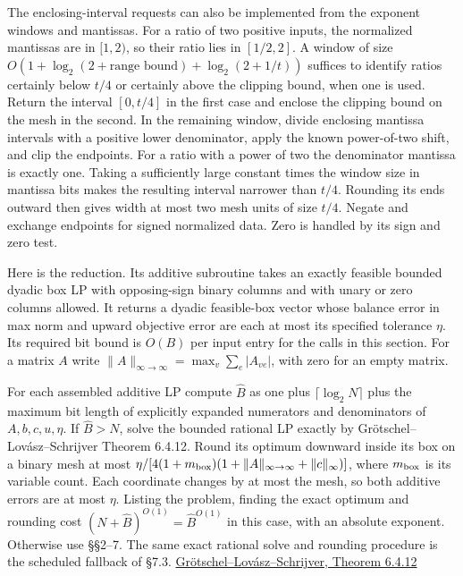 \documentclass[11pt]{article}
\begin{document}
The enclosing-interval requests can also be implemented from the exponent windows and mantissas. For a ratio of two positive inputs, the normalized mantissas are in \([1,2)\), so their ratio lies in \([1/2,2]\). A window of size \(O(1+\log_2(2+\text{range bound})+\log_2(2+1/t))\) suffices to identify ratios certainly below \(t/4\) or certainly above the clipping bound, when one is used. Return the interval \([0,t/4]\) in the first case and enclose the clipping bound on the mesh in the second. In the remaining window, divide enclosing mantissa intervals with a positive lower denominator, apply the known power-of-two shift, and clip the endpoints. For a ratio with a power of two the denominator mantissa is exactly one. Taking a sufficiently large constant times the window size in mantissa bits makes the resulting interval narrower than \(t/4\). Rounding its ends outward then gives width at most two mesh units of size \(t/4\). Negate and exchange endpoints for signed normalized data. Zero is handled by its sign and zero test.

Here is the reduction. Its additive subroutine takes an exactly feasible bounded dyadic box LP with opposing-sign binary columns and with unary or zero columns allowed. It returns a dyadic feasible-box vector whose balance error in max norm and upward objective error are each at most its specified tolerance \(\eta\). Its required bit bound is \(O(B)\) per input entry for the calls in this section. For a matrix \(A\) write \(\|A\|_{\infty\to\infty}=\max_v\sum_e|A_{ve}|\), with zero for an empty matrix.

For each assembled additive LP compute \(\widehat B\) as one plus \(\lceil\log_2 N\rceil\) plus the maximum bit length of explicitly expanded numerators and denominators of \(A,b,c,u,\eta\). If \(\widehat B>N\), solve the bounded rational LP exactly by Grötschel--Lovász--Schrijver Theorem 6.4.12. Round its optimum downward inside its box on a binary mesh at most \(\eta/[4(1+m_{\rm box})(1+\|A\|_{\infty\to\infty}+\|c\|_\infty)]\), where \(m_{\rm box}\) is its variable count. Each coordinate changes by at most the mesh, so both additive errors are at most \(\eta\). Listing the problem, finding the exact optimum and rounding cost \((N+\widehat B)^{O(1)}=\widehat B^{O(1)}\) in this case, with an absolute exponent. Otherwise use §§2--7. The same exact rational solve and rounding procedure is the scheduled fallback of §7.3. \href{https://www.zib.de/userpage/groetschel/pubnew/paper/groetschellovaszschrijver1988.pdf\#page=192}{Grötschel--Lovász--Schrijver, Theorem 6.4.12}
\end{document}
